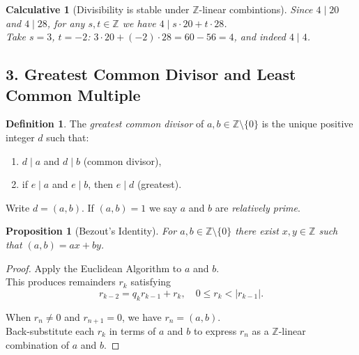 \documentclass[12pt]{article}
\newtheorem{proposition}[theorem]{Proposition}
\newtheorem{calculative}[theorem]{Calculative}
\theoremstyle{definition}
\newtheorem{definition}{Definition}
\begin{document}
\dotfill

\begin{calculative}[Divisibility is stable under $\mathbb{Z}$-linear combintions]

\noindent
Since $4\mid 20$ and $4\mid 28$, for any $s,t\in\mathbb{Z}$ we have $4\mid s\cdot 20+t\cdot 28$. \\

\noindent
Take $s=3$, $t=-2$: $3\cdot 20+(-2)\cdot 28=60-56=4$, and indeed $4\mid 4$.
\end{calculative}


\newpage

\subsection*{3. Greatest Common Divisor and Least Common Multiple}

\begin{definition}
The \emph{greatest common divisor} of $a,b\in\mathbb{Z}\setminus\{0\}$ is the unique positive integer $d$ such that:
\begin{enumerate}
    \item $d\mid a$ and $d\mid b$ (common divisor),
    \item if $e\mid a$ and $e\mid b$, then $e\mid d$ (greatest).
\end{enumerate}
Write $d = (a,b)$. If $(a,b)=1$ we say $a$ and $b$ are \emph{relatively prime}.
\end{definition}

\dotfill

\begin{proposition}[Bezout's Identity]
For $a,b\in\mathbb{Z}\setminus\{0\}$ there exist $x,y\in\mathbb{Z}$ such that $(a,b) = ax+by$.
\end{proposition}

\vspace{1em}

\begin{proof}
Apply the Euclidean Algorithm to $a$ and $b$. \\

\noindent
This produces remainders $r_k$ satisfying
\[
r_{k-2} = q_k r_{k-1} + r_k,\quad 0 \le r_k < |r_{k-1}|.
\]

\noindent
When $r_n\neq 0$ and $r_{n+1}=0$, we have $r_n = (a,b)$. \\

\noindent
Back-substitute each $r_k$ in terms of $a$ and $b$ to express $r_n$ as a $\mathbb{Z}$-linear combination of $a$ and $b$.
\end{proof}
\end{document}
